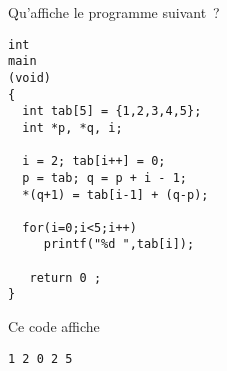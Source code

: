 Qu'affiche le programme suivant~?
\begin{verbatim}
int 
main
(void)
{
  int tab[5] = {1,2,3,4,5};
  int *p, *q, i;
  
  i = 2; tab[i++] = 0;
  p = tab; q = p + i - 1;
  *(q+1) = tab[i-1] + (q-p);

  for(i=0;i<5;i++)
     printf("%d ",tab[i]);

   return 0 ;
}
\end{verbatim}
\ifcorrection
\begin{correction}
  Ce code affiche
\begin{verbatim}
1 2 0 2 5 
\end{verbatim}
\end{correction}
\fi
